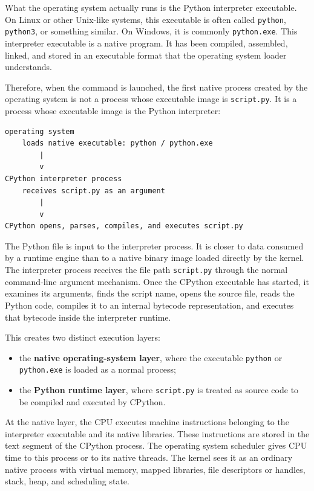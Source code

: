 \documentclass[a4paper,twoside]{report}
\begin{document}
What the operating system actually runs is the Python interpreter executable. On Linux or other Unix-like systems, this executable is often called \texttt{python}, \texttt{python3}, or something similar. On Windows, it is commonly \texttt{python.exe}. This interpreter executable is a native program. It has been compiled, assembled, linked, and stored in an executable format that the operating system loader understands.

Therefore, when the command is launched, the first native process created by the operating system is not a process whose executable image is \texttt{script.py}. It is a process whose executable image is the Python interpreter:

\begin{verbatim}
operating system
    loads native executable: python / python.exe
        |
        v
CPython interpreter process
    receives script.py as an argument
        |
        v
CPython opens, parses, compiles, and executes script.py
\end{verbatim}

The Python file is input to the interpreter process. It is closer to data consumed by a runtime engine than to a native binary image loaded directly by the kernel. The interpreter process receives the file path \texttt{script.py} through the normal command-line argument mechanism. Once the CPython executable has started, it examines its arguments, finds the script name, opens the source file, reads the Python code, compiles it to an internal bytecode representation, and executes that bytecode inside the interpreter runtime.

This creates two distinct execution layers:

\begin{itemize}
    \item the \textbf{native operating-system layer}, where the executable \texttt{python} or \texttt{python.exe} is loaded as a normal process;
    \item the \textbf{Python runtime layer}, where \texttt{script.py} is treated as source code to be compiled and executed by CPython.
\end{itemize}

At the native layer, the CPU executes machine instructions belonging to the interpreter executable and its native libraries. These instructions are stored in the text segment of the CPython process. The operating system scheduler gives CPU time to this process or to its native threads. The kernel sees it as an ordinary native process with virtual memory, mapped libraries, file descriptors or handles, stack, heap, and scheduling state.
\end{document}

